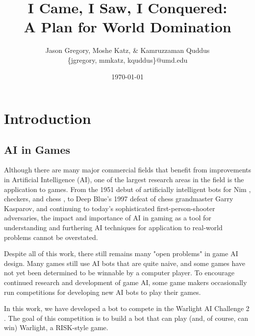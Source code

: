 \documentclass[a4paper,11pt]{article}
\begin{document}
\title{I Came, I Saw, I Conquered: \\ A Plan for World Domination}
\author{Jason Gregory, Moshe Katz, \& Kamruzzaman Quddus \\ \{jgregory, mmkatz, kquddus\}@umd.edu}
\date{\today}

\maketitle


\section{Introduction}\label{sec:intro}
\subsection{AI in Games}\label{aiingames}
Although there are many major commercial fields that benefit from improvements
in Artificial Intelligence (AI), one of the largest research areas in the field is
the application to games.  From the 1951 debut of artificially intelligent bots
for Nim \cite{nim}, checkers, and chess \cite{checkerschess}, to Deep Blue's 1997
defeat of chess grandmaster Garry Kasparov, and continuing to today's sophisticated
first-person-shooter adversaries, the impact and importance of AI in gaming as a
tool for understanding and furthering AI techniques for application to real-world 
problems cannot be overstated.

Despite all of this work, there still remains many "open problems" in game AI
design.  Many games still use AI bots that are quite naive, and some games have
not yet been determined to be winnable by a computer player. To encourage continued
research and development of game AI, some game makers occasionally run competitions
for developing new AI bots to play their games.

In this work, we have developed a bot to compete in the Warlight AI Challenge 2 
\cite{warlight}. The goal of this competition is to build a bot that can play (and, of 
course, can win) Warlight, a RISK-style game.
\end{document}
